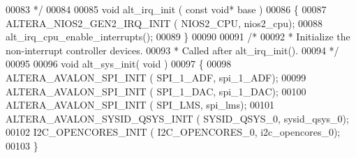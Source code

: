 \begin{DoxyCode}
00083 \textcolor{comment}{ */}
00084 
00085 \textcolor{keywordtype}{void} alt_irq_init ( \textcolor{keyword}{const} \textcolor{keywordtype}{void}* base )
00086 \{
00087     ALTERA_NIOS2_GEN2_IRQ_INIT ( NIOS2\_CPU, nios2\_cpu);
00088     alt_irq_cpu_enable_interrupts();
00089 \}
00090 
00091 \textcolor{comment}{/*}
00092 \textcolor{comment}{ * Initialize the non-interrupt controller devices.}
00093 \textcolor{comment}{ * Called after alt\_irq\_init().}
00094 \textcolor{comment}{ */}
00095 
00096 \textcolor{keywordtype}{void} alt_sys_init( \textcolor{keywordtype}{void} )
00097 \{
00098     ALTERA_AVALON_SPI_INIT ( SPI\_1\_ADF, spi\_1\_ADF);
00099     ALTERA_AVALON_SPI_INIT ( SPI\_1\_DAC, spi\_1\_DAC);
00100     ALTERA_AVALON_SPI_INIT ( SPI\_LMS, spi\_lms);
00101     ALTERA_AVALON_SYSID_QSYS_INIT ( SYSID\_QSYS\_0, sysid\_qsys\_0);
00102     I2C_OPENCORES_INIT ( I2C\_OPENCORES\_0, i2c\_opencores\_0);
00103 \}
\end{DoxyCode}
